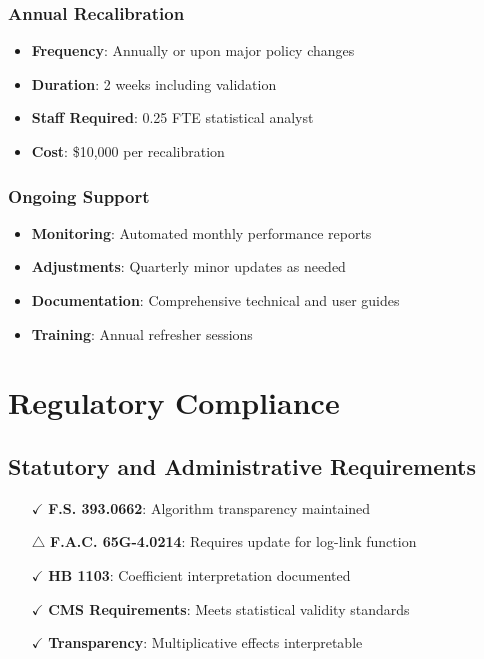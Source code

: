 \subsubsection{Annual Recalibration}
\begin{itemize}
    \item \textbf{Frequency}: Annually or upon major policy changes
    \item \textbf{Duration}: 2 weeks including validation
    \item \textbf{Staff Required}: 0.25 FTE statistical analyst
    \item \textbf{Cost}: \$10,000 per recalibration
\end{itemize}

\subsubsection{Ongoing Support}
\begin{itemize}
    \item \textbf{Monitoring}: Automated monthly performance reports
    \item \textbf{Adjustments}: Quarterly minor updates as needed
    \item \textbf{Documentation}: Comprehensive technical and user guides
    \item \textbf{Training}: Annual refresher sessions
\end{itemize}

\section{Regulatory Compliance}

\subsection{Statutory and Administrative Requirements}

\begin{itemize}
    \item[$\checkmark$] \textbf{F.S. 393.0662}: Algorithm transparency maintained
    \item[$\triangle$] \textbf{F.A.C. 65G-4.0214}: Requires update for log-link function
    \item[$\checkmark$] \textbf{HB 1103}: Coefficient interpretation documented
    \item[$\checkmark$] \textbf{CMS Requirements}: Meets statistical validity standards
    \item[$\checkmark$] \textbf{Transparency}: Multiplicative effects interpretable
\end{itemize}

